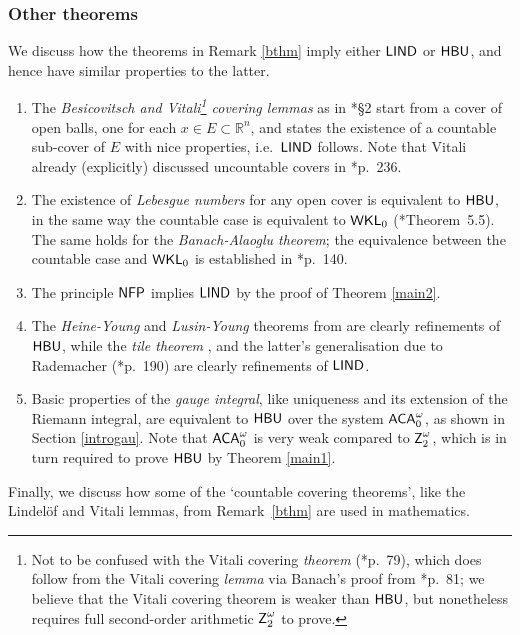 \documentclass[reqno]{amsart}
\newcommand{\Z}{{\textsf{\textup{Z}}}}
\def\ACAo{\textup{\textsf{ACA}}_{0}^{\omega}}
\def\WKL{\textup{\textsf{WKL}}}
\def\R{{\mathbb  R}}
\def\NFP{\textup{\textsf{NFP}}}
\def\HBU{\textup{\textsf{HBU}}}
\def\LIND{\textup{\textsf{LIND}}}
\numberwithin{equation}{section}
\numberwithin{thm}{section}
\begin{document}
\subsubsection{Other theorems}\label{other}
We discuss how the theorems in Remark \ref{bthm} imply either $\LIND$ or $\HBU$, and hence have similar properties to the latter.    
\begin{enumerate}
\item The \emph{Besicovitsch and Vitali\footnote{Not to be confused with the Vitali covering \emph{theorem} (\cite{bartle}*{p.\ 79}), which does follow from the Vitali covering \emph{lemma} via Banach's proof from \cite{naatjenaaien}*{p.\ 81}; we believe that the Vitali covering theorem is weaker than $\HBU$, but nonetheless requires full second-order arithmetic $\Z_{2}^{\omega}$ to prove. } covering lemmas} as in \cite{auke}*{\S2} start from a cover of open balls, one for each $x\in E\subset \R^{n}$, and states the existence 
of a countable sub-cover of $E$ with nice properties, i.e.\ $\LIND$ follows.  Note that Vitali already (explicitly) discussed uncountable covers in \cite{vitaliorg}*{p.\ 236}.  
\item The existence of \emph{Lebesgue numbers} for {any} open cover is equivalent to $\HBU$, in the same way the countable case is equivalent to $\WKL_{0}$ (\cite{moregusto}*{Theorem~5.5}). 
The same holds for the \emph{Banach-Alaoglu theorem}; the equivalence between the countable case and $\WKL_{0}$ is established in \cite{xbrownphd}*{p.\ 140}.
\item The principle $\NFP$ implies $\LIND$ by the proof of Theorem \ref{main2}.  
\item The \emph{Heine-Young} and \emph{Lusin-Young} theorems from \cite{YY} are clearly refinements of $\HBU$, while the  \emph{tile theorem} \cite{YY, wildehilde}, and the latter's generalisation due to Rademacher (\cite{rademachen}*{p.\ 190}) are clearly refinements of $\LIND$. 
\item Basic properties of the \emph{gauge integral}, like uniqueness and its extension of the Riemann integral, are equivalent to $\HBU$
over the system $\ACAo$, as shown in Section \ref{introgau}.  Note that $\ACAo$ is very weak compared to $\Z_{2}^{\omega}$, which is in turn required to prove $\HBU$ by Theorem \ref{main1}.   
\end{enumerate}
Finally, we discuss how some of the `countable covering theorems', like the Lindel\"of and Vitali lemmas, from Remark~\ref{bthm} are used in mathematics.  
\end{document}

